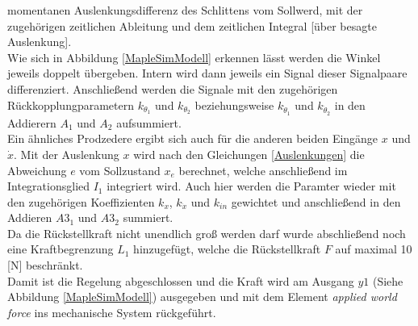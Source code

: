 \documentclass[a4paper, 10pt]{report}
\begin{document}
momentanen Auslenkungsdifferenz des Schlittens vom Sollwerd, mit der zugehörigen zeitlichen Ableitung und dem zeitlichen Integral [über besagte Auslenkung]. \\
Wie sich in Abbildung \ref{MapleSimModell} erkennen lässt werden die Winkel jeweils doppelt übergeben. Intern wird dann jeweils ein Signal dieser Signalpaare differenziert. Anschließend werden die Signale mit den zugehörigen Rückkopplungparametern $k_{\theta_{1}}$ und $k_{\theta_{2}}$ beziehungsweise $k_{\dot{\theta}_{1}}$ und $k_{\dot{\theta}_{2}}$ in den Addierern $A_{1}$ und $A_{2}$ aufsummiert. \\
Ein ähnliches Prodzedere ergibt sich auch für die anderen beiden Eingänge $x$ und  $\dot{x}$. Mit der Auslenkung $x$ wird nach den Gleichungen \ref{Auslenkungen} die Abweichung $e$ vom Sollzustand $x_{e}$ berechnet, welche anschließend im Integrationsglied $I_{1}$ integriert wird. Auch hier werden die Paramter wieder mit den zugehörigen Koeffizienten $k_{x}$, $k_{\dot{x}}$ und $k_{in}$ gewichtet und anschließend in den Addieren $A3_{1}$ und $A3_{2}$ summiert. \\
Da die Rückstellkraft nicht unendlich groß werden darf wurde abschließend noch eine Kraftbegrenzung $L_{1}$ hinzugefügt, welche die Rückstellkraft $F$ auf maximal 10 [N] beschränkt. \\
Damit ist die Regelung abgeschlossen und die Kraft wird am Ausgang $y1$ (Siehe Abbildung \ref{MapleSimModell}) ausgegeben und mit dem Element \textit{applied world force} ins mechanische System rückgeführt.
\end{document}
